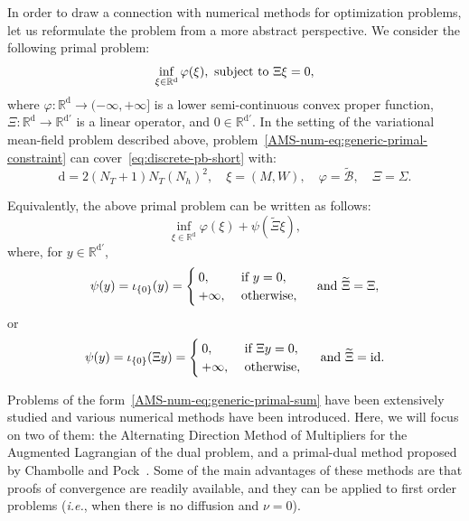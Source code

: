 \documentclass{amsproc}
\theoremstyle{definition}
\theoremstyle{remark}
\numberwithin{equation}{section}
\newcommand{\RR}{{\mathbb R}}
\newcommand{\cB}{{\mathcal B}}
\begin{document}
In order to draw a connection with numerical methods for optimization problems, let us reformulate the problem from a more abstract perspective. We consider the following primal problem:
\begin{equation}
\label{AMS-num-eq:generic-primal-constraint}
	\inf_{\xi \in \RR^{\mathrm{d}}} \varphi(\xi), \hbox{ subject to } \Xi \xi = 0, 
\end{equation}
where $\varphi: \RR^{\mathrm{d}} \to (-\infty, +\infty]$ is a lower semi-continuous convex proper function, $\Xi: \RR^{\mathrm{d}} \to \RR^{\mathrm{d}'}$ is a linear operator,  and $0 \in \RR^{\mathrm{d}'}$. In the setting of the variational mean-field problem described above, problem~\eqref{AMS-num-eq:generic-primal-constraint} can cover~\eqref{eq:discrete-pb-short} with:
$$
	\mathrm{d} = 2(N_T+1) N_T (N_h)^2, \quad \xi = (M,W), \quad \varphi = \tilde\cB, \quad \Xi = \Sigma.
$$

Equivalently, the above primal problem can be written as follows:
\begin{equation}
\label{AMS-num-eq:generic-primal-sum}
	\inf_{\xi \in \RR^{\mathrm{d}}} \varphi(\xi) + \psi(\widetilde \Xi \xi), 
\end{equation}
where, for $y \in \RR^{\mathrm{d}'}$, 
$$
	\psi(y) = \iota_{\{0\}}(y) 
	= \begin{cases}
	0, &\hbox{ if } y = 0,
	\\
	+\infty, &\hbox{ otherwise},
	\end{cases}
	\quad \hbox{ and } 
	\widetilde \Xi = \Xi,
$$
or
$$
	\psi(y) = \iota_{\{0\}}(\Xi y) 
	= \begin{cases}
	0, &\hbox{ if }  \Xi y = 0,
	\\
	+\infty, &\hbox{ otherwise},
	\end{cases}
	\quad \hbox{ and } 
	\widetilde \Xi = \mathrm{id}.
$$



Problems of the form~\eqref{AMS-num-eq:generic-primal-sum} have been extensively studied and various numerical methods have been introduced. Here, we will focus on two of them: the Alternating Direction Method of Multipliers for the Augmented Lagrangian of the dual problem, and a primal-dual method proposed by Chambolle and Pock~\cite{MR2782122}. Some of the main advantages of these methods are that proofs of convergence are readily available, and they can be applied to first order problems (\textit{i.e.}, when there is no diffusion and $\nu=0$).
\end{document}
